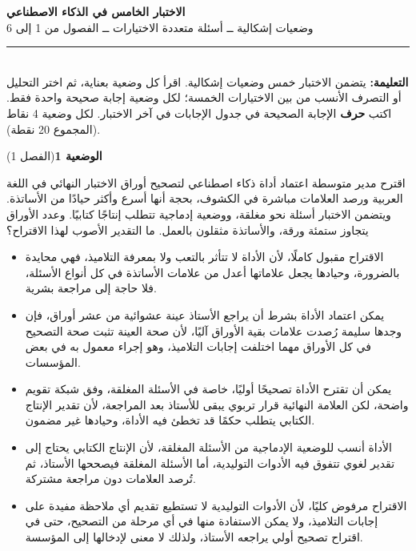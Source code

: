 \documentclass[11pt,a4paper]{article}
\begin{document}
\linespread{1.08}\selectfont
\begin{center}
{\LARGE\khatt\textbf{الاختبار الخامس في الذكاء الاصطناعي}}\\[4pt]
{\normalsize وضعيات إشكالية ــ أسئلة متعددة الاختيارات ــ الفصول من 1 إلى 6}
\end{center}
\vspace{-2pt}\rule{\textwidth}{0.6pt}\\[2pt]
\textbf{التعليمة:} يتضمن الاختبار خمس وضعيات إشكالية. اقرأ كل وضعية بعناية، ثم اختر التحليل أو التصرف الأنسب
من بين الاختيارات الخمسة؛ لكل وضعية إجابة صحيحة واحدة فقط.
اكتب \textbf{حرف} الإجابة الصحيحة في جدول الإجابات في آخر الاختبار.
لكل وضعية 4 نقاط (المجموع 20 نقطة).
\vspace{4pt}

\noindent
{\large\khatt\textbf{الوضعية 1}}\hfill{\small(الفصل 1)}\par\nopagebreak\vspace{3pt}
\setlength{\fboxsep}{7pt}\colorbox{gray!10}{\parbox{\dimexpr\linewidth-14pt}{اقترح مدير متوسطة اعتماد أداة ذكاء اصطناعي لتصحيح أوراق الاختبار النهائي في اللغة العربية ورصد العلامات مباشرة في الكشوف، بحجة أنها أسرع وأكثر حيادًا من الأساتذة. ويتضمن الاختبار أسئلة نحو مغلقة، ووضعية إدماجية تتطلب إنتاجًا كتابيًا. وعدد الأوراق يتجاوز ستمئة ورقة، والأساتذة مثقلون بالعمل. ما التقدير الأصوب لهذا الاقتراح؟}}\par\nopagebreak
\begin{itemize}[leftmargin=1.0cm, labelsep=6pt, itemsep=3pt, topsep=4pt, parsep=0pt]
  \item[\textbf{أ)}] الاقتراح مقبول كاملًا، لأن الأداة لا تتأثر بالتعب ولا بمعرفة التلاميذ، فهي محايدة بالضرورة، وحيادها يجعل علاماتها أعدل من علامات الأساتذة في كل أنواع الأسئلة، فلا حاجة إلى مراجعة بشرية.
  \item[\textbf{ب)}] يمكن اعتماد الأداة بشرط أن يراجع الأستاذ عينة عشوائية من عشر أوراق، فإن وجدها سليمة رُصدت علامات بقية الأوراق آليًا، لأن صحة العينة تثبت صحة التصحيح في كل الأوراق مهما اختلفت إجابات التلاميذ، وهو إجراء معمول به في بعض المؤسسات.
  \item[\textbf{ج)}] يمكن أن تقترح الأداة تصحيحًا أوليًا، خاصة في الأسئلة المغلقة، وفق شبكة تقويم واضحة، لكن العلامة النهائية قرار تربوي يبقى للأستاذ بعد المراجعة، لأن تقدير الإنتاج الكتابي يتطلب حكمًا قد تخطئ فيه الأداة، وحيادها غير مضمون.
  \item[\textbf{د)}] الأداة أنسب للوضعية الإدماجية من الأسئلة المغلقة، لأن الإنتاج الكتابي يحتاج إلى تقدير لغوي تتفوق فيه الأدوات التوليدية، أما الأسئلة المغلقة فيصححها الأستاذ، ثم تُرصد العلامات دون مراجعة مشتركة.
  \item[\textbf{هـ)}] الاقتراح مرفوض كليًا، لأن الأدوات التوليدية لا تستطيع تقديم أي ملاحظة مفيدة على إجابات التلاميذ، ولا يمكن الاستفادة منها في أي مرحلة من التصحيح، حتى في اقتراح تصحيح أولي يراجعه الأستاذ، ولذلك لا معنى لإدخالها إلى المؤسسة.
\end{itemize}
\end{document}
